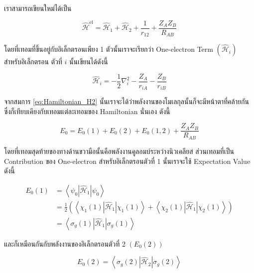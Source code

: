 \noindent เราสามารถเขียนใหม่ได้เป็น

\begin{equation}
    \label{eq:Hamiltonian_H2_simple}
    \hat{\mathscr{H}}^{\mathrm{el}} 
    = \hat{\mathscr{H}}_1+\hat{\mathscr{H}}_2+\frac{1}{r_{12}}+\frac{Z_A Z_B}{R_{A B}}
\end{equation}

\noindent โดยที่เทอมที่ขึ้นอยู่กับอิเล็กตรอนเพียง 1 ตัวนั้นเราจะเรียกว่า One-electron Term $(\hat{\mathscr{H}}_i)$ สำหรับอิเล็กตรอน%
ตัวที่ $i$ นั้นเขียนได้ดังนี้

\begin{equation}
    \hat{\mathscr{H}}_i 
    = 
    -\frac{1}{2} \nabla_i^2 
    -\frac{Z_A}{r_{i A}} 
    -\frac{Z_B}{r_{i B}}
\end{equation}

จากสมการ \ref{eq:Hamiltonian_H2} นั้นเราจะได้ว่าพลังงานของโมเลกุลนั้นก็จะมีหน้าตาที่คล้ายกันซึ่งก็เทียบเคียงกับเทอมแต่ละเทอมของ 
Hamiltonian นั่นเอง ดังนี้

\begin{equation}
    \label{eq:Energy_hydrogen_molecule}
    E_0 = E_0(1) + E_0(2) + E_0(1,2) + \frac{Z_A Z_B}{R_{A B}}
\end{equation}

\noindent โดยที่เทอมสุดท้ายของทางด้านขวามือนั้นคือพลังงานคูลอมบ์ระหว่างนิวเคลียส ส่วนเทอมที่เป็น Contribution ของ One-electron 
สำหรับอิเล็กตรอนตัวที่ 1 นั้นเราจะใช้ Expectation Value ดังนี้

\begin{equation}
    \begin{aligned}
        E_0(1) 
        & = \left\langle\psi_0\left|\hat{\mathscr{H}}_1\right| \psi_0\right\rangle \\
        & = \frac{1}{2}\left(\left\langle\chi_1(1)\left|\hat{\mathscr{H}}_1\right| \chi_1(1)\right\rangle 
            + \left\langle\chi_2(1)\left|\hat{\mathscr{H}}_1\right| \chi_2(1)\right\rangle\right) \\
        & = \left\langle\sigma_g(1)\left|\hat{\mathscr{H}}_1\right| \sigma_g(1)\right\rangle
    \end{aligned}
\end{equation}

\noindent และก็เหมือนกันกับพลังงานของอิเล็กตรอนตัวที่ 2 $(E_0(2))$

\begin{equation}
    E_0(2)=\left\langle\sigma_g(2)\left|\hat{\mathscr{H}}_2\right| \sigma_g(2)\right\rangle
\end{equation}

